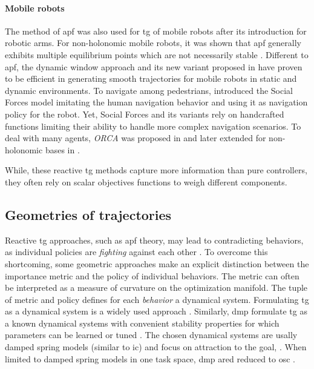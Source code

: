 \paragraph{Mobile robots}

The method of \ac{apf} was also used for \ac{tg} of mobile
robots after its introduction for robotic arms.
For non\hyp{}holonomic mobile robots, it was shown that \ac{apf}
generally exhibits multiple equilibrium points which are not
necessarily stable \cite{urakubo2018stability}.
Different to \ac{apf}, the dynamic window approach
\cite{Fox1997} and its new variant proposed in
\cite{Zhang2019} have proven to be efficient in generating
smooth trajectories for mobile robots in static and dynamic
environments. To navigate among pedestrians,
\cite{Ferrer2013} introduced the Social Forces model
imitating the human navigation behavior and using it as
navigation policy for the robot.  Yet, Social Forces and its
variants rely on handcrafted functions limiting their
ability to handle more complex navigation scenarios. To deal
with many agents, \textit{ORCA} was proposed in
\cite{VanDenBerg2011} and later extended for non\hyp{}holonomic
bases in \cite{Alonso-Mora2012a}.


While, these reactive \ac{tg} methods capture more
information than pure controllers, they often rely on 
scalar objectives functions to weigh different components.

\subsection{Geometries of trajectories}
\label{sec:geometries_of_trajectories}

Reactive \ac{tg} approaches, such as \ac{apf} theory,
may lead to contradicting behaviors, as individual policies
are \textit{fighting} against each other \cite{Ratliff2018}.
To overcome this shortcoming, some geometric approaches make
an explicit distinction between the importance metric and
the policy of individual behaviors. The metric can often be
interpreted as a measure of curvature on the optimization
manifold. The tuple of metric and policy defines
for each \textit{behavior} a dynamical system.
Formulating \ac{tg} as a dynamical system is a widely used
approach \cite{khansari2012dynamical,huber2023avoidance}.
Similarly, \ac{dmp} formulate \ac{tg} as a known dynamical
systems with convenient stability properties for which
parameters can be learned or tuned
\cite{saveriano2023dynamic,ijspeert2013dynamical}. The
chosen dynamical systems are usally damped spring models
(similar to \ac{ic}) and focus on attraction to the goal,
\cite{perez2023stable}. When limited to damped spring models
in one task space, \ac{dmp} ared reduced to \ac{osc}
\cite{Khatib1987a}.
%

